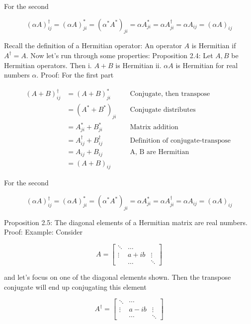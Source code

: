 \documentclass[main.tex]{subfiles}
\begin{document}
    For the second
    
    $$
    (\alpha A)_{i j}^{\dagger}=(\alpha A)_{j i}^{*}=\left(\alpha^{*} A^{*}\right)_{j i}=\alpha A_{j i}^{*}=\alpha A_{j i}^{\dagger}=\alpha A_{i j}=(\alpha A)_{i j}
    $$
    
    Recall the definition of a Hermitian operator: An operator $A$ is Hermitian if $A^{\dagger}=A$.
    Now let's run through some properties: Proposition 2.4: Let $A, B$ be Hermitian operators. Then i. $A+B$ is Hermitian ii. $\alpha A$ is Hermitian for real numbers $\alpha$. Proof: For the first part
    
    $$
    \begin{aligned}
    (A+B)_{i j}^{\dagger} &=(A+B)_{j i}^{*} & & \text { Conjugate, then transpose } \\
    &=\left(A^{*}+B^{*}\right)_{j i} & & \text { Conjugate distributes } \\
    &=A_{j i}^{*}+B_{j i}^{*} & & \text { Matrix addition } \\
    &=A_{i j}^{\dagger}+B_{i j}^{\dagger} & & \text { Definition of conjugate-transpose } \\
    &=A_{i j}+B_{i j} & & \text { A, B are Hermitian } \\
    &=(A+B)_{i j} & &
    \end{aligned}
    $$
    
    For the second
    
    $$
    (\alpha A)_{i j}^{\dagger}=(\alpha A)_{j i}^{*}=\left(\alpha^{*} A^{*}\right)_{j i}=\alpha A_{j i}^{*}=\alpha A_{j i}^{\dagger}=\alpha A_{i j}=(\alpha A)_{i j}
    $$

    Proposition 2.5: The diagonal elements of a Hermitian matrix are real numbers. Proof: Example: Consider
    
    $$
    A=\left[\begin{array}{ccc}
    \ddots & \ldots & \\
    \vdots & a+i b & \vdots \\
    & \ldots & \ddots
    \end{array}\right]
    $$
    
    and let's focus on one of the diagonal elements shown. Then the transpose conjugate will end up conjugating this element
    
    $$
    A^{\dagger}=\left[\begin{array}{ccc}
    \ddots & \cdots & \\
    \vdots & a-i b & \vdots \\
    & \cdots & \ddots
    \end{array}\right]
    $$
    
\end{document}
